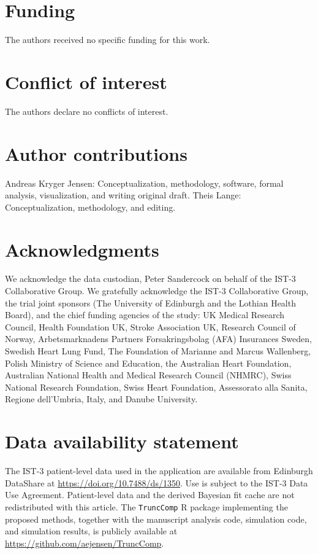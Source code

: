 \documentclass[11pt]{article}
\begin{document}
\section*{Funding}
The authors received no specific funding for this work.

\section*{Conflict of interest}
The authors declare no conflicts of interest.

\section*{Author contributions}
Andreas Kryger Jensen: Conceptualization, methodology, software, formal
analysis, visualization, and writing original draft. Theis Lange: Conceptualization, methodology, and editing.

\section*{Acknowledgments}
We acknowledge the data custodian, Peter Sandercock on behalf of the IST-3 Collaborative Group. We gratefully acknowledge the IST-3 Collaborative Group, the trial joint sponsors (The University of Edinburgh and the Lothian Health Board), and the chief funding agencies of the study: UK Medical Research Council, Health Foundation UK, Stroke Association UK, Research Council of Norway, Arbetsmarknadens Partners Forsakringsbolag (AFA) Insurances Sweden, Swedish Heart Lung Fund, The Foundation of Marianne and Marcus Wallenberg, Polish Ministry of Science and Education, the Australian Heart Foundation, Australian National Health and Medical Research Council (NHMRC), Swiss National Research Foundation, Swiss Heart Foundation, Assessorato alla Sanita, Regione dell'Umbria, Italy, and Danube University.

\section*{Data availability statement}
The IST-3 patient-level data used in the application are available from Edinburgh DataShare at \url{https://doi.org/10.7488/ds/1350}. Use is subject to the IST-3 Data Use Agreement. Patient-level data and the derived Bayesian fit cache are not redistributed with this article. The \texttt{TruncComp} R package implementing the proposed methods, together with the manuscript analysis code, simulation code, and simulation results, is publicly available at \url{https://github.com/aejensen/TruncComp}.
\end{document}
